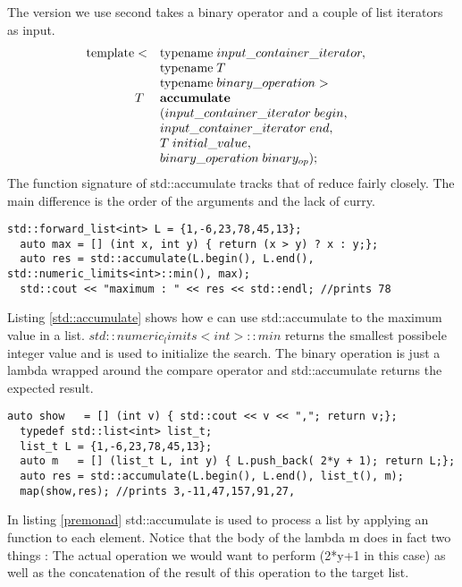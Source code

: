 \documentclass[12pt,fleqn]{article}
\begin{document}
The version we use second takes a binary operator and a couple of list iterators as input.
\[
\begin{array}{rll}
\mbox{template}<&\mbox{typename}\; input\_container\_iterator, \\
               &\mbox{typename}  \; T \\
             &\mbox{typename} \; binary\_operation >&\\
T \;& \mbox{\bf accumulate}\\
&( input\_container\_iterator\; begin, \\
& input\_container\_iterator\; end, \\
& T \; initial\_value, \\
& binary\_operation \; binary_{op} );
\end{array}
\]
The function signature of std::accumulate tracks that of reduce fairly closely.
The main difference is the order of the arguments and the lack of curry.
\begin{lstlisting}[caption=example of std::accumulate,label=std::accumulate]
std::forward_list<int> L = {1,-6,23,78,45,13};
  auto max = [] (int x, int y) { return (x > y) ? x : y;};
  auto res = std::accumulate(L.begin(), L.end(), std::numeric_limits<int>::min(), max);
  std::cout << "maximum : " << res << std::endl; //prints 78
\end{lstlisting}
Listing \ref{std::accumulate} shows how e can use std::accumulate to the maximum value in a list.
$std::numeric_limits<int>::min$ returns the smallest possibele integer value and is used to initialize the search.
The binary operation is just a lambda wrapped around the compare operator and std::accumulate returns the expected result.

\begin{lstlisting}[caption=processing a list using reduce,label=premonad]
 auto show   = [] (int v) { std::cout << v << ","; return v;};
  typedef std::list<int> list_t;
  list_t L = {1,-6,23,78,45,13};
  auto m   = [] (list_t L, int y) { L.push_back( 2*y + 1); return L;};
  auto res = std::accumulate(L.begin(), L.end(), list_t(), m);
  map(show,res); //prints 3,-11,47,157,91,27,
\end{lstlisting}
In listing \ref{premonad} std::accumulate is used to process a list by applying an function to each element.
Notice that the body of the lambda m does in fact two things : The actual operation we would want to perform (2*y+1 in this case) as well as the concatenation of the result of this operation to the target list. 
\end{document}
